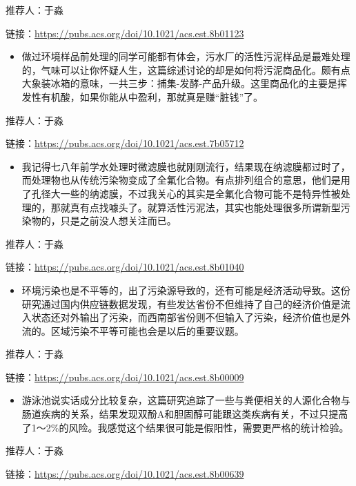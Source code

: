\documentclass[]{book}
\providecommand{\tightlist}{%
  \setlength{\itemsep}{0pt}\setlength{\parskip}{0pt}}
\begin{document}
推荐人：于淼

链接：\url{https://pubs.acs.org/doi/10.1021/acs.est.8b01123}

\begin{itemize}
\tightlist
\item
  做过环境样品前处理的同学可能都有体会，污水厂的活性污泥样品是最难处理的，气味可以让你怀疑人生，这篇综述讨论的却是如何将污泥商品化。颇有点大象装冰箱的意味，一共三步：捕集-发酵-产品升级。这里商品化的主要是挥发性有机酸，如果你能从中盈利，那就真是赚``脏钱''了。
\end{itemize}

推荐人：于淼

链接：\url{https://pubs.acs.org/doi/10.1021/acs.est.7b05712}

\begin{itemize}
\tightlist
\item
  我记得七八年前学水处理时微滤膜也就刚刚流行，结果现在纳滤膜都过时了，而处理物也从传统污染物变成了全氟化合物。有点排列组合的意思，他们是用了孔径大一些的纳滤膜，不过我关心的其实是全氟化合物可能不是特异性被处理的，那就真有点找噱头了。就算活性污泥法，其实也能处理很多所谓新型污染物的，只是之前没人想关注而已。
\end{itemize}

推荐人：于淼

链接：\url{https://pubs.acs.org/doi/10.1021/acs.est.8b01040}

\begin{itemize}
\tightlist
\item
  环境污染也是不平等的，出了污染源导致的，还有可能是经济活动导致。这份研究通过国内供应链数据发现，有些发达省份不但维持了自己的经济价值是流入状态还对外输出了污染，而西南部省份则不但输入了污染，经济价值也是外流的。区域污染不平等可能也会是以后的重要议题。
\end{itemize}

推荐人：于淼

链接：\url{https://pubs.acs.org/doi/10.1021/acs.est.8b00009}

\begin{itemize}
\tightlist
\item
  游泳池说实话成分比较复杂，这篇研究追踪了一些与粪便相关的人源化合物与肠道疾病的关系，结果发现双酚A和胆固醇可能跟这类疾病有关，不过只提高了1～2\%的风险。我感觉这个结果很可能是假阳性，需要更严格的统计检验。
\end{itemize}

推荐人：于淼

链接：\url{https://pubs.acs.org/doi/10.1021/acs.est.8b00639}
\end{document}
